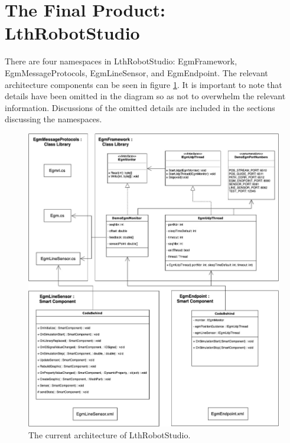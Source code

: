 \documentclass{cslthse-msc}
\begin{document}
\section{The Final Product: LthRobotStudio}
\label{sec:Result:LthRobotStudio}
There are four namespaces in LthRobotStudio: EgmFramework, EgmMessageProtocols, EgmLineSensor, and EgmEndpoint. The relevant architecture components can be seen in figure \ref{fig:LthRobotStudio}. It is important to note that details have been omitted in the diagram so as not to overwhelm the relevant information. Discussions of the omitted details are included in the sections discussing the namespaces.
\begin{figure}[H]
    \centering
    \includegraphics[width=12cm]{LthRobotStudio.jpg}
    \caption{The current architecture of LthRobotStudio.}
    \label{fig:LthRobotStudio}
\end{figure}
\end{document}
